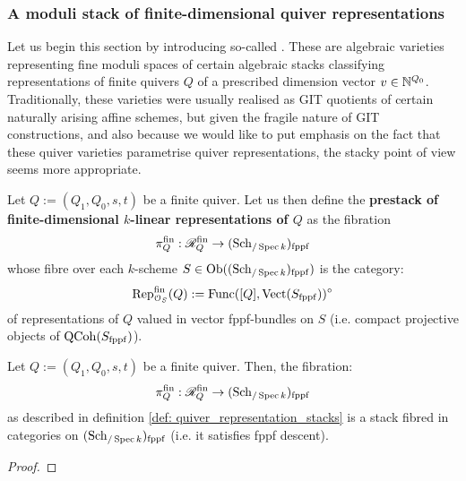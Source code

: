         \subsubsection{A moduli stack of finite-dimensional quiver representations}
            Let us begin this section by introducing so-called . These are algebraic varieties representing fine moduli spaces of certain algebraic stacks classifying representations of finite quivers $Q$ of a prescribed dimension vector $v \in \mathbb{N}^{Q_0}$. Traditionally, these varieties were usually realised as GIT quotients of certain naturally arising affine schemes, but given the fragile nature of GIT constructions, and also because we would like to put emphasis on the fact that these quiver varieties parametrise quiver representations, the stacky point of view seems more appropriate. 
            \begin{definition} \label{def: quiver_representation_stacks}
                Let $Q := (Q_1, Q_0, s, t)$ be a finite quiver. Let us then define the \textbf{prestack of finite-dimensional $k$-linear representations of $Q$} as the fibration
                    $$\pi_Q^{\mathrm{fin}}: \mathscr{R}_Q^{\mathrm{fin}} \to (\mathrm{Sch}_{/\operatorname{Spec} k})_{\mathrm{fppf}}$$
                whose fibre over each $k$-scheme $S \in \mathrm{Ob}((\mathrm{Sch}_{/\operatorname{Spec} k})_{\mathrm{fppf}})$ is the category:
                    $$\mathrm{Rep}_{\mathcal{O}_S}^{\mathrm{fin}}(Q) := \mathrm{Func}([Q], \mathrm{Vect}(S_{\mathrm{fppf}}))^{\circ}$$
                of representations of $Q$ valued in vector fppf-bundles on $S$ (i.e. compact projective objects of $\mathrm{QCoh}(S_{\mathrm{fppf}})$).  
            \end{definition}
            \begin{proposition}
                Let $Q := (Q_1, Q_0, s, t)$ be a finite quiver. Then, the fibration:
                    $$\pi_Q^{\mathrm{fin}}: \mathscr{R}_Q^{\mathrm{fin}} \to (\mathrm{Sch}_{/\operatorname{Spec} k})_{\mathrm{fppf}}$$
                as described in definition \ref{def: quiver_representation_stacks} is a stack fibred in categories on $(\mathrm{Sch}_{/\operatorname{Spec} k})_{\mathrm{fppf}}$ (i.e. it satisfies fppf descent).
            \end{proposition}
                \begin{proof}
                    
                \end{proof}
                
